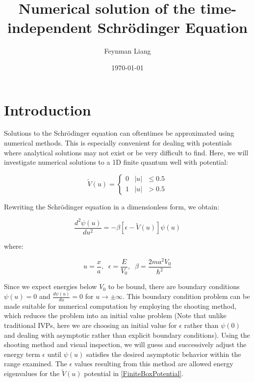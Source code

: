 \documentclass{article}
\title{Numerical solution of the time-independent Schr\"{o}dinger Equation}
\author{Feynman Liang}
\date{\today}
\begin{document}
\maketitle

\section{Introduction}
Solutions to the Schr\"{o}dinger equation can oftentimes be approximated using numerical
methods. This is especially convenient for dealing with potentials where analytical 
solutions may not exist or be very difficult to find. Here, we will investigate numerical 
solutions to a 1D finite quantum well with potential:

\begin{equation}\label{FiniteBoxPotential}
    \widetilde{V}(u)=
    \begin{cases} 0 & \text{\(\lvert u\rvert\) $\le 0.5$}
    \\
    1 & \text{\(\lvert u\rvert\) $> 0.5$}
\end{cases}
\end{equation}

Rewriting the Schr\"{o}dinger equation in a dimensionless form, we obtain:

\begin{equation}\label{FiniteBoxSchrodinger}
    \frac{d^{2}\psi(u)}{du^{2}} = -\beta\left[\epsilon-\widetilde{V}(u)\right]\psi(u)
\end{equation}

where:

\begin{equation*}\label{DimensionlessSubstitutions}
    u = \frac{x}{a},\;\;
    \epsilon = \frac{E}{V_{0}},\;\;
    \beta = \frac{2ma^{2}V_0}{\hbar^2}
\end{equation*}

Since we expect energies below $V_0$ to be bound, there are boundary conditions
$\psi(u) = 0$ and $\frac{d\psi(u)}{du} = 0$ for $u \rightarrow \pm \infty$.
This boundary condition problem can be made suitable for numerical computation
by employing the shooting method, which reduces the problem into an initial
value problem (Note that unlike traditional IVPs, here we are choosing an initial
value for $\epsilon$ rather than $\psi(0)$ and dealing with asymptotic rather than
explicit boundary conditions). Using the shooting method and visual inspection,
we will guess and successively adjust the energy term $\epsilon$ until
$\psi(u)$ satisfies the desired asymptotic behavior within the range examined.
The $\epsilon$ values resulting from this method are allowed energy eigenvalues
for the $\widetilde{V}(u)$ potential in \eqref{FiniteBoxPotential}.
\end{document}

